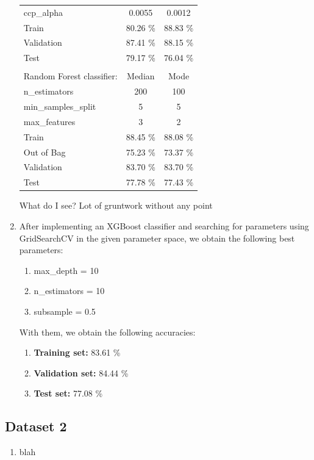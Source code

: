 \documentclass[12pt]{article}
\begin{document}
\begin{enumerate}[label=(\alph*)]
\begin{center}
\begin{tabular}{l c c}
        \hspace{3mm} ccp\_alpha & 0.0055 & 0.0012 \\
        \hspace{3mm} Train & 80.26 \% & 88.83 \% \\
        \hspace{3mm} Validation & 87.41 \% & 88.15 \% \\
        \hspace{3mm} Test & 79.17 \% & 76.04 \% \\
            & & \\
        Random Forest classifier: & Median & Mode \\
        \hline
        \hspace{3mm} n\_estimators & 200 & 100 \\
        \hspace{3mm} min\_samples\_split & 5 & 5 \\
        \hspace{3mm} max\_features & 3 & 2 \\
        \hspace{3mm} Train & 88.45 \% & 88.08 \% \\
        \hspace{3mm} Out of Bag & 75.23 \% & 73.37 \% \\
        \hspace{3mm} Validation & 83.70 \% & 83.70 \% \\
        \hspace{3mm} Test & 77.78 \% & 77.43 \% \\
    \end{tabular}
    \end{center}

    What do I see? Lot of gruntwork without any point %
    
    \item After implementing an XGBoost classifier and searching for parameters
    using GridSearchCV in the given parameter space, we obtain the following 
    best parameters:
    \begin{enumerate}[label=(\roman*)]
        \item max\_depth = 10
        \item n\_estimators = 10
        \item subsample = 0.5
    \end{enumerate}

    With them, we obtain the following accuracies:
    \begin{enumerate}[label=(\roman*)]
        \item \textbf{Training set:} 83.61 \%
        \item \textbf{Validation set:} 84.44 \%
        \item \textbf{Test set:} 77.08 \%
    \end{enumerate}
\end{enumerate}

\subsection{Dataset 2}

\begin{enumerate}[label=(\alph*)]
    \item blah
\end{enumerate}
\end{document}
